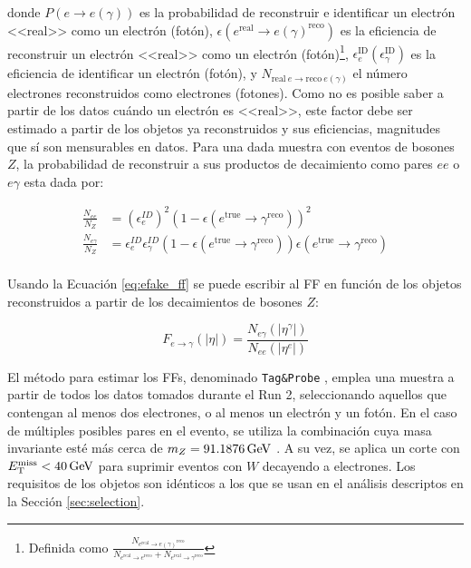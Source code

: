 \noindent
donde $P(e\to e(\gamma))$ es la probabilidad de reconstruir e identificar un electrón <<real>> como un electrón (fotón), $\epsilon(e^{\text{real}}\to e(\gamma)^{\text{reco}})$ es la eficiencia de reconstruir un electrón <<real>> como un electrón (fotón)\footnote{Definida como $\frac{N_{e^{\text{real}}\to e(\gamma)^{\text{reco}}}}{N_{e^{\text{real}}\to e^{\text{reco}}}+N_{e^{\text{real}}\to \gamma^{\text{reco}}}}$}, $\epsilon^{\text{ID}}_{e} (\epsilon^{\text{ID}}_{\gamma})$ es la eficiencia de identificar un electrón (fotón), y $N_{\text{real}\ e\to \text{reco}\ e(\gamma)}$ el número electrones reconstruidos como electrones (fotones). Como no es posible saber a partir de los datos cuándo un electrón es <<real>>, este factor debe ser estimado a partir de los objetos ya reconstruidos y sus eficiencias, magnitudes que sí son mensurables en datos. Para una dada muestra con eventos de bosones $Z$, la probabilidad de reconstruir a sus productos de decaimiento como pares $ee$ o $e\gamma$ esta dada por:

\begin{equation}
\begin{split}
\frac{N_{ee}}{N_Z} & = (\epsilon^{ID}_{e})^{2} (1-\epsilon(e^{\text{true}}\to \gamma^{\text{reco}}))^{2} \\
\frac{N_{e\gamma}}{N_Z} & = \epsilon^{ID}_{e}\epsilon^{ID}_{\gamma} (1-\epsilon(e^{\text{true}}\to \gamma^{\text{reco}}))\epsilon(e^{\text{true}}\to \gamma^{\text{reco}}) \\
\end{split}
\end{equation}


Usando la Ecuación \ref{eq:efake_ff} se puede escribir al FF en función de los objetos reconstruidos a partir de los decaimientos de bosones $Z$:

\begin{equation}
  F_{e\to \gamma}(|\eta|) = \frac{N_{e\gamma}(|\eta^{\gamma}|)}{N_{ee}(|\eta^{e}|)}
\end{equation}


El método para estimar los FFs, denominado \texttt{Tag\&Probe} \cite{tesis_gonza}, emplea una muestra a partir de todos los datos tomados durante el Run 2, seleccionando aquellos que contengan al menos dos electrones, o al menos un electrón y un fotón. En el caso de múltiples posibles pares en el evento, se utiliza la combinación cuya masa invariante esté más cerca de $m_Z=91.1876\,\text{GeV}$ \cite{ParticleDataGroup:2018ovx}. A su vez, se aplica un corte con $E_{\text{T}}^{\text{miss}}<40\,\text{GeV}$ para suprimir eventos con $W$ decayendo a electrones. Los requisitos de los objetos son idénticos a los que se usan en el análisis descriptos en la Sección \ref{sec:selection}.

